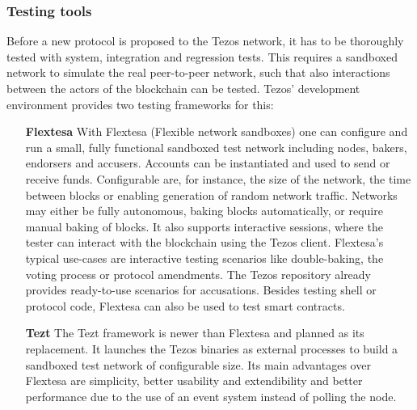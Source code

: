 \subsubsection{Testing tools}
Before a new protocol is proposed to the Tezos network, it has to be thoroughly tested with system, integration and regression tests. This requires a sandboxed network to simulate the real peer-to-peer network, such that also interactions between the actors of the blockchain can be tested. Tezos' development environment provides two testing frameworks for this:
\begin{itemize}
\item[\textbf{Flextesa}] With Flextesa (Flexible network sandboxes)\cite{tezos_docs} one can configure and run a small, fully functional sandboxed test network including nodes, bakers, endorsers and accusers. Accounts can be instantiated and used to send or receive funds. Configurable are, for instance, the size of the network, the time between blocks or enabling generation of random network traffic. Networks may either be fully autonomous, baking blocks automatically, or require manual baking of blocks. It also supports interactive sessions, where the tester can interact with the blockchain using the Tezos client. Flextesa's typical use-cases are interactive testing scenarios like double-baking, the voting process or protocol amendments. The Tezos repository already provides ready-to-use scenarios for accusations. Besides testing shell or protocol code, Flextesa can also be used to test smart contracts.
\item[\textbf{Tezt}] The Tezt framework \cite{tezos_docs} is newer than Flextesa and planned as its replacement. It launches the Tezos binaries as external processes to build a sandboxed test network of configurable size. Its main advantages over Flextesa are simplicity, better usability and extendibility and better performance due to the use of an event system instead of polling the node.
\end{itemize}

